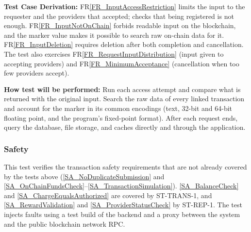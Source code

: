 \documentclass[12pt]{article}
\newcommand{\rref}[1]{FR\ref{#1}}
\newcommand{\saref}[1]{\ref{#1}}
\newcommand{\fixture}[1]{\texttt{\seqsplit{#1}}}
\begin{document}
\begin{enumerate}
\textbf{Test Case Derivation:} \rref{FR_InputAccessRestriction} limits the input to the requester and the providers
that accepted; \fixture{P3} checks that being registered is not enough. \rref{FR_InputNotOnChain}
forbids readable input on the blockchain, and the marker value makes it
possible to search raw on-chain data for it. \rref{FR_InputDeletion} requires deletion after both
completion and cancellation. The test also exercises \rref{FR_RequestInputDistribution} (input given to
accepting providers) and \rref{FR_MinimumAcceptance} (cancellation when too few providers accept).

\textbf{How test will be performed:} Run each access attempt and compare what is
returned with the original input. Search the raw data of every linked
transaction and account for the marker in its common encodings (text, 32-bit
and 64-bit floating point, and the program's fixed-point format). After each
request ends, query the database, file storage, and caches directly and
through the application.

\end{enumerate}

\subsubsection{Safety}

This test verifies the transaction safety requirements that are not already
covered by the tests above (\saref{SA_NoDuplicateSubmission} and \saref{SA_OnChainFundsCheck}--\saref{SA_TransactionSimulation}). \saref{SA_BalanceCheck} and \saref{SA_ChargeEqualsAuthorized}
are covered by ST-TRANS-1, and \saref{SA_RewardValidation} and \saref{SA_ProviderStatusCheck} by ST-REP-1. The test
injects faults using a test build of the backend and a proxy between the
system and the public blockchain network RPC.
\end{document}
